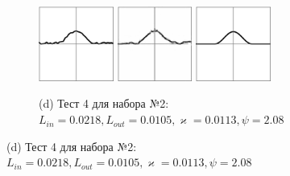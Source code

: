 \documentclass[12pt, a4paper]{article}
\renewcommand{\kappa}{\varkappa}
\begin{document}
\begin{figure}[!hp]
	\centering
	\begin{subfigure}{\textwidth}
		\centering
		\includegraphics[width=0.27\textwidth]{res_n1_7}
		\hfill
		\includegraphics[width=0.27\textwidth]{res_n2_8}
		\hfill
		\includegraphics[width=0.27\textwidth]{4}
		\caption*{\small (d) Тест 4 для набора №2: $L_{in} = 0.0218, L_{out} = 0.0105, \kappa = 0.0113, \psi = 2.08$}
	\end{subfigure}
	

\end{figure}
\end{document}
